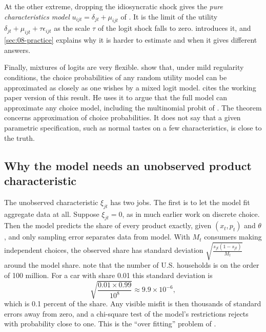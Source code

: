 At the other extreme, dropping the idiosyncratic shock gives the \emph{pure characteristics model}
$u_{ijt} = \delta_{jt} + \mu_{ijt}$ of \citet{BerryPakes2007}. It is the limit of the utility
$\delta_{jt} + \mu_{ijt} + \tau\epsilon_{ijt}$ as the scale $\tau$ of the logit shock falls to zero.
 introduces it, and \cref{sec:08-practice} explains why it is harder to estimate and when it
gives different answers.

Finally, mixtures of logits are very flexible. \citet{McFaddenTrain2000} show that, under mild regularity
conditions, the choice probabilities of any random utility model can be approximated as closely as one wishes
by a mixed logit model. \citet[pp.~316--317]{Nevo2001} cites the working paper version of this result. He
uses it to argue that the full model can approximate any choice model, including the multinomial probit of
\citet{HausmanWise1978}. The theorem concerns
approximation of choice probabilities. It does not say that a given parametric specification, such as normal
tastes on a few characteristics, is close to the truth.

\subsection{Why the model needs an unobserved product characteristic}\label{sec:08-xi}

The unobserved characteristic $\xi_{jt}$ has two jobs. The first is to let the model fit aggregate data at
all. Suppose $\xi_{jt} = 0$, as in much earlier work on discrete choice. Then the model predicts the share of
every product exactly, given $(x_t, p_t)$ and $\theta$, and only sampling error separates data from model.
With $M_t$ consumers making independent choices, the observed share has standard deviation
$\sqrt{\frac{s_{jt}(1 - s_{jt})}{M_t}}$ around the model share. \citet[p.~859]{BerryLevinsohnPakes1995} note
that the number of U.S. households is on the order of 100 million. For a car with share 0.01 this standard
deviation is
\begin{equation*}
  \sqrt{\frac{0.01 \times 0.99}{10^8}} \approx 9.9 \times 10^{-6},
\end{equation*}
which is 0.1 percent of the share. Any visible misfit is then thousands of standard errors away from zero, and
a chi-square test of the model's restrictions rejects with probability close to one. This is the
``over fitting'' problem of \citet[p.~850]{BerryLevinsohnPakes1995}.

